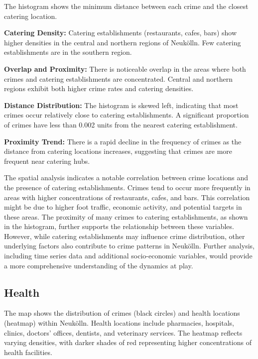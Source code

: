 The histogram shows the minimum distance between each crime and the closest catering location.

\textbf{Catering Density:} Catering establishments (restaurants, cafes, bars) show higher densities in the central and northern regions of Neukölln. Few catering establishments are in the southern region. 

\textbf{Overlap and Proximity:} There is noticeable overlap in the areas where both crimes and catering establishments are concentrated. Central and northern regions exhibit both higher crime rates and catering densities. 

\textbf{Distance Distribution:} The histogram is skewed left, indicating that most crimes occur relatively close to catering establishments. A significant proportion of crimes have less than 0.002 units from the nearest catering establishment. 

\textbf{Proximity Trend:} There is a rapid decline in the frequency of crimes as the distance from catering locations increases, suggesting that crimes are more frequent near catering hubs. 

The spatial analysis indicates a notable correlation between crime locations and the presence of catering establishments. Crimes tend to occur more frequently in areas with higher concentrations of restaurants, cafes, and bars. This correlation might be due to higher foot traffic, economic activity, and potential targets in these areas. The proximity of many crimes to catering establishments, as shown in the histogram, further supports the relationship between these variables. However, while catering establishments may influence crime distribution, other underlying factors also contribute to crime patterns in Neukölln. Further analysis, including time series data and additional socio-economic variables, would provide a more comprehensive understanding of the dynamics at play. 

\subsection{Health}
The map shows the distribution of crimes (black circles) and health locations (heatmap) within Neukölln. Health locations include pharmacies, hospitals, clinics, doctors' offices, dentists, and veterinary services. The heatmap reflects varying densities, with darker shades of red representing higher concentrations of health facilities. 

